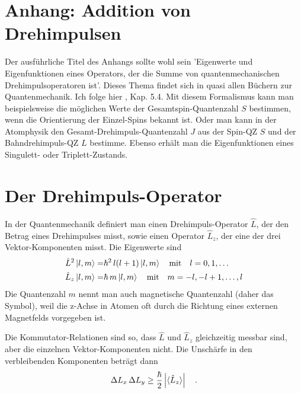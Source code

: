 


\section{Anhang: Addition von Drehimpulsen}

Der ausführliche Titel des Anhangs sollte wohl sein 'Eigenwerte und Eigenfunktionen eines Operators, der die Summe von quantenmechanischen Drehimpulsoperatoren ist'. Dieses Thema findet sich in quasi allen Büchern zur Quantenmechanik. Ich folge hier \cite{Nolting-QM}, Kap. 5.4. Mit diesem Formalismus kann man beispielsweise die möglichen Werte der Gesamtspin-Quantenzahl $S$ bestimmen, wenn die Orientierung der Einzel-Spins bekannt ist. Oder man kann in der Atomphysik den Gesamt-Drehimpuls-Quantenzahl $J$ aus der Spin-QZ $S$ und der Bahndrehimpuls-QZ $L$ bestimme. Ebenso erhält man die Eigenfunktionen eines Singulett- oder Triplett-Zustands.

\section*{Der Drehimpuls-Operator}

In der Quantenmechanik definiert man einen Drehimpuls-Operator $\hat{L}$, der den Betrag eines Drehimpulses misst, sowie einen Operator $\hat{L}_z$, der eine der drei Vektor-Komponenten misst. Die Eigenwerte sind 
\begin{align}
	\hat{L}^2 \ket{l, m}  = & \hbar^2 \, l (l +1 ) \ket{l, m} \quad 
	\text{mit} \quad l = 0, 1, \dots \\
	\hat{L}_z \ket{l, m} = & \hbar \, m \ket{l, m} \quad 
	\text{mit} \quad m = -l, -l +1, \dots , l
\end{align}
Die Quantenzahl $m$ nennt man auch magnetische Quantenzahl (daher das Symbol), weil die z-Achse in Atomen oft durch die Richtung eines externen Magnetfelds vorgegeben ist.

Die Kommutator-Relationen sind so, dass $\hat{L}$ und $\hat{L}_z$ gleichzeitig messbar sind, aber die  einzelnen Vektor-Komponenten nicht. Die Unschärfe in den verbleibenden Komponenten beträgt dann
\begin{equation}
\Delta L_x \, \Delta L_y \ge \frac{\hbar}{2} \left| \braket{\hat{L}_z} \right| \quad .
\end{equation}

